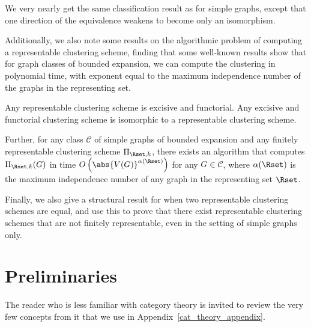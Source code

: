 \documentclass[a4paper,reqno,oneside]{article} %
\begin{document}
We very nearly get the same classification result as for simple graphs, except that one direction of the equivalence weakens to become only an isomorphism.

Additionally, we also note some results on the algorithmic problem of computing a representable clustering scheme, finding that some well-known results show that for graph classes of bounded expansion, we can compute the clustering in polynomial time, with exponent equal to the maximum independence number of the graphs in the representing set.

\begin{theorem}
    Any representable clustering scheme is excisive and functorial. Any excisive and functorial clustering scheme is isomorphic to a representable clustering scheme. 
    
    Further, for any class $\mathcal{C}$ of simple graphs of bounded expansion and any finitely representable clustering scheme $\Pi_{\Rset,k}$, there exists an algorithm that computes $\Pi_{\Rset,k}(G)$ in time $O\left(\abs{V(G)}^{\alpha(\Rset)}\right)$ for any $G \in \mathcal{C}$, where $\alpha(\Rset)$ is the maximum independence number of any graph in the representing set $\Rset$.
\end{theorem}
 
Finally, we also give a structural result for when two representable clustering schemes are equal, and use this to prove that there exist representable clustering schemes that are not finitely representable, even in the setting of simple graphs only.

\section{Preliminaries}

The reader who is less familiar with category theory is invited to review the very few concepts from it that we use in Appendix~\ref{cat_theory_appendix}.
\end{document}
